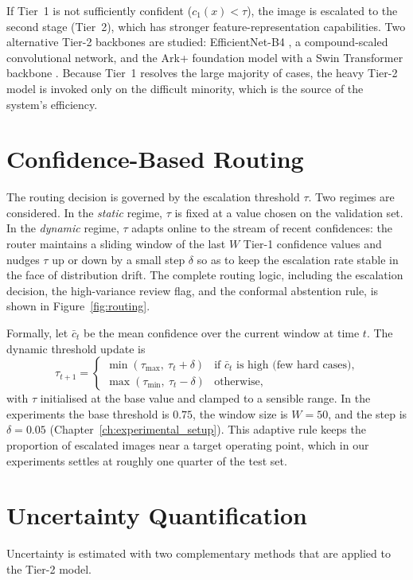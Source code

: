If Tier~1 is not sufficiently confident ($c_1(x) < \tau$), the image is escalated to the second stage (Tier~2), which has stronger feature-representation capabilities. Two alternative Tier-2 backbones are studied: EfficientNet-B4 \cite{tan2019efficientnet}, a compound-scaled convolutional network, and the Ark+ foundation model \cite{ma2023foundation} with a Swin Transformer backbone \cite{liu2021swin}. Because Tier~1 resolves the large majority of cases, the heavy Tier-2 model is invoked only on the difficult minority, which is the source of the system's efficiency.

\section{Confidence-Based Routing}
\label{sec:routing}
The routing decision is governed by the escalation threshold $\tau$. Two regimes are considered. In the \emph{static} regime, $\tau$ is fixed at a value chosen on the validation set. In the \emph{dynamic} regime, $\tau$ adapts online to the stream of recent confidences: the router maintains a sliding window of the last $W$ Tier-1 confidence values and nudges $\tau$ up or down by a small step $\delta$ so as to keep the escalation rate stable in the face of distribution drift. The complete routing logic, including the escalation decision, the high-variance review flag, and the conformal abstention rule, is shown in Figure~\ref{fig:routing}.



Formally, let $\bar{c}_t$ be the mean confidence over the current window at time $t$. The dynamic threshold update is
\begin{equation}
    \tau_{t+1} =
    \begin{cases}
        \min(\tau_{\max},\ \tau_t + \delta) & \text{if } \bar{c}_t \text{ is high (few hard cases),}\\
        \max(\tau_{\min},\ \tau_t - \delta) & \text{otherwise,}
    \end{cases}
\end{equation}
with $\tau$ initialised at the base value and clamped to a sensible range. In the experiments the base threshold is $0.75$, the window size is $W=50$, and the step is $\delta=0.05$ (Chapter~\ref{ch:experimental_setup}). This adaptive rule keeps the proportion of escalated images near a target operating point, which in our experiments settles at roughly one quarter of the test set.

\section{Uncertainty Quantification}
\label{sec:uncertainty}
Uncertainty is estimated with two complementary methods that are applied to the Tier-2 model.

